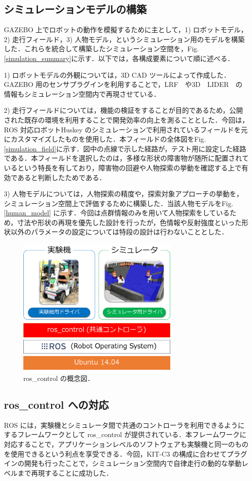 \documentclass[10pt,a4paper]{jarticle}
\begin{document}
\subsection{シミュレーションモデルの構築}
\label{subsec:simulationmodel}
GAZEBO 上でロボットの動作を模擬するために主として，1) ロボットモデル，2) 走行フィールド，3) 人物モデル，というシミュレーション用のモデルを構築した．これらを統合して構築したシミュレーション空間を，Fig.\ref{simulation_summary}に示す．以下では，各構成要素について順に述べる．

1) ロボットモデルの外観については，3D CAD ツールによって作成した．GAZEBO 用のセンサプラグインを利用することで，LRF　や3D　LIDER　の情報もシミュレーション空間内で再現させている．

2) 走行フィールドについては，機能の検証をすることが目的であるため，公開された既存の環境を利用することで開発効率の向上を測ることとした．今回は，ROS 対応ロボットHuskey \cite{husky} のシミュレーションで利用されているフィールドを元にカスタマイズしたものを使用した．本フィールドの全体図をFig.\ref{simulation_field}に示す．図中の点線で示した経路が，テスト用に設定した経路である．本フィールドを選択したのは，多様な形状の障害物が随所に配置されているという特長を有しており，障害物の回避や人物探索の挙動を確認する上で有効であると判断したためである．

3) 人物モデルについては，人物探索の精度や，探索対象アプローチの挙動を，シミュレーション空間上で評価するために構築した．当該人物モデルをFig. \ref{human_model} に示す．今回は点群情報のみを用いて人物探索をしているため，寸法や形状の再現を優先した設計を行ったが，色情報や反射強度といった形状以外のパラメータの設定については特段の設計は行わないこととした．

\begin{figure}[ht]
    \centering
    \includegraphics[width=8cm]{./fig/png/ros_control.png}
    \caption{ros\_control の概念図．}
    \label{ros_control}
\end{figure}

\subsection{ros\_control への対応}
\label{subsec:ros_control}
ROS には，実験機とシミュレータ間で共通のコントローラを利用できるようにするフレームワークとして ros\_control が提供されている．本フレームワークに対応することで，アプリケーションレベルのソフトウェアも実験機と同一のものを使用できるという利点を享受できる．今回，KIT-C3 の構成に合わせてプラグインの開発も行ったことで，シミュレーション空間内で自律走行の動的な挙動レベルまで再現することに成功した．
\end{document}
